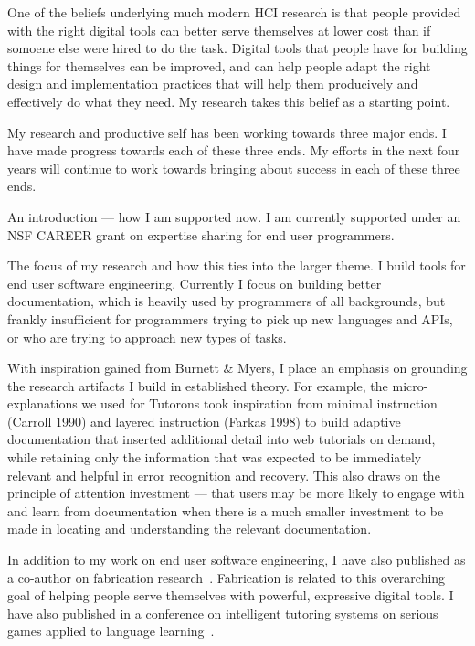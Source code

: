 \documentclass[12pt]{memoir}
\title{}
\author{Andrew Head}
\begin{document}


One of the beliefs underlying much modern HCI research is that people provided with the right digital tools can better serve themselves at lower cost than if somoene else were hired to do the task.
Digital tools that people have for building things for themselves can be improved, and can help people adapt the right design and implementation practices that will help them producively and effectively do what they need.
My research takes this belief as a starting point.

My research and productive self has been working towards three major ends.
I have made progress towards each of these three ends.
My efforts in the next four years will continue to work towards bringing about success in each of these three ends.

An introduction --- how I am supported now.
I am currently supported under an NSF CAREER grant on expertise sharing for end user programmers.

The focus of my research and how this ties into the larger theme.
I build tools for end user software engineering.
Currently I focus on building better documentation, which is heavily used by programmers of all backgrounds, but frankly insufficient for programmers trying to pick up new languages and APIs, or who are trying to approach new types of tasks.

With inspiration gained from Burnett \& Myers, I place an emphasis on grounding the research artifacts I build in established theory.
For example, the micro-explanations we used for Tutorons took inspiration from minimal instruction (Carroll 1990) and layered instruction (Farkas 1998) to build adaptive documentation that inserted additional detail into web tutorials on demand, while retaining only the information that was expected to be immediately relevant and helpful in error recognition and recovery.
This also draws on the principle of attention investment --- that users may be more likely to engage with and learn from documentation when there is a much smaller investment to be made in locating and understanding the relevant documentation.

In addition to my work on end user software engineering, I have also published as a co-author on fabrication research~\cite{savage_lamello_2015}.
Fabrication is related to this overarching goal of helping people serve themselves with powerful, expressive digital tools.
I have also published in a conference on intelligent tutoring systems on serious games applied to language learning~\cite{head_tonewars_2014}.
\end{document}
